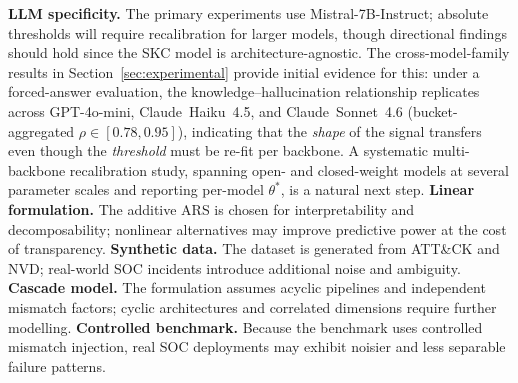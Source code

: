 \textbf{LLM specificity.} The primary experiments use Mistral-7B-Instruct;
absolute thresholds will require recalibration for larger models, though
directional findings should hold since the SKC model is
architecture-agnostic. The cross-model-family results in
Section~\ref{sec:experimental} provide initial evidence for this: under a
forced-answer evaluation, the knowledge--hallucination relationship
replicates across GPT-4o-mini, Claude~Haiku~4.5, and Claude~Sonnet~4.6
(bucket-aggregated $\rho \in [0.78, 0.95]$), indicating that the
\textit{shape} of the signal transfers even though the \textit{threshold}
must be re-fit per backbone. A systematic multi-backbone
recalibration study, spanning open- and closed-weight models at several
parameter scales and reporting per-model $\theta^*$, is a natural next
step.
\textbf{Linear formulation.} The additive ARS is chosen for
interpretability and decomposability; nonlinear alternatives may improve
predictive power at the cost of transparency.
\textbf{Synthetic data.} The dataset is generated from ATT\&CK and NVD;
real-world SOC incidents introduce additional noise and ambiguity.
\textbf{Cascade model.} The formulation assumes acyclic pipelines and
independent mismatch factors; cyclic architectures and correlated
dimensions require further modelling.
\textbf{Controlled benchmark.} Because the benchmark uses controlled
mismatch injection, real SOC deployments may exhibit noisier and
less separable failure patterns.
